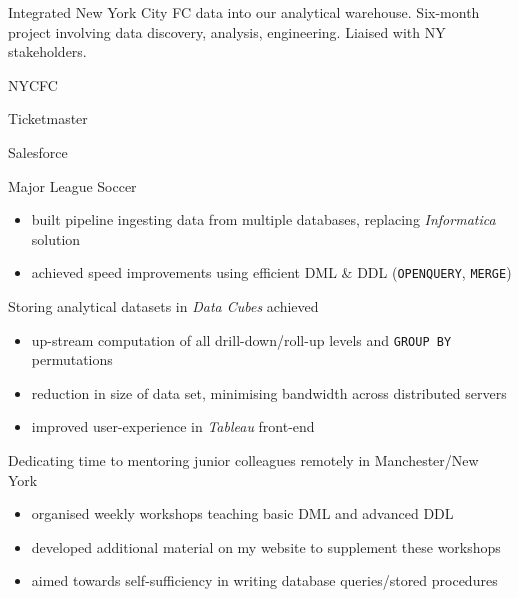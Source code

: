 \documentclass[letterpaper,11pt]{article}
\begin{document}
\begin{description}[style=multiline,leftmargin=3cm]
	\item[NYCFC Data Integration \textnormal{Project Owner}]

	      Integrated New York City FC  data into our analytical warehouse.
	      Six-month project involving data discovery, analysis, engineering. Liaised with NY stakeholders.
	      \begin{itemize*}
		      \item NYCFC
		      \item Ticketmaster
		      \item Salesforce
		      \item Major League Soccer
	      \end{itemize*}
	      \begin{description}[style=multiline,leftmargin=2.5cm]
		      \item[Data Pipeline]
		            {
		            \begin{itemize}
			            \item built pipeline ingesting data from multiple databases, replacing \textit{Informatica} solution
			            \item achieved speed improvements using efficient DML \& DDL (\texttt{OPENQUERY}, \texttt{MERGE})
		            \end{itemize}
		            }
		      \item[Data Cubes]
		            Storing analytical datasets in \textit{Data Cubes} achieved
		            \begin{itemize}
			            \item up-stream computation of all drill-down/roll-up levels and \texttt{GROUP BY} permutations
			            \item reduction in size of data set, minimising bandwidth across distributed servers
			            \item improved user-experience in \textit{Tableau} front-end
		            \end{itemize}

		      \item[Mentoring]
		            Dedicating time to mentoring junior colleagues remotely in Manchester/New York
		            \begin{itemize}
			            \item organised weekly workshops teaching basic DML and advanced DDL
			            \item developed additional material on my website to supplement these workshops
			            \item aimed towards self-sufficiency in writing database queries/stored procedures
		            \end{itemize}


\end{description}
\end{description}
\end{document}
